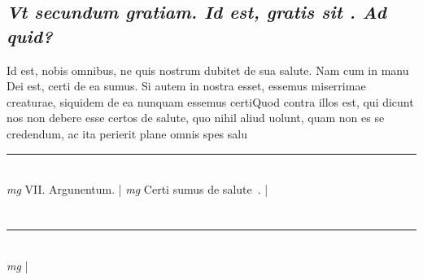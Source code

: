 \documentclass{article}
\begin{document}
\begin{pages}
\subsection*{\textit{Vt secundum gratiam. Id est, gratis sit . Ad quid? }}\pstart Id est, nobis omnibus, ne quis nostrum dubitet de sua salute. Nam cum in manu Dei est, certi de ea sumus. Si autem in nostra esset, essemus miserrimae creaturae, siquidem de ea nunquam essemus certiQuod contra illos est, qui dicunt nos non debere esse certos de salute, quo nihil aliud uolunt, quam non es se credendum, ac ita perierit plane omnis spes salu\pend
\vspace{0.5cm}\noindent
\vspace{0.2cm}\rule{1cm}{0.2pt}\\ 
\hspace{0.2cm}\textit{mg}
\footnotesize VII. Argunentum. 
\normalsize| 
\hspace{0.2cm}\textit{mg}
\footnotesize Certi sumus de salute .  
\normalsize| 
\section*{}\pstart  \pend\pstart  \pend\pstart  \pend
{}
{}
\subsection*{\textit{}}
{}
\subsection*{\textit{}}
{}
\subsection*{\textit{}}
{}
\subsection*{\textit{}}
{}
\subsection*{\textit{}}
\vspace{0.5cm}\noindent
\vspace{0.2cm}\rule{1cm}{0.2pt}\\ 
\hspace{0.2cm}\textit{mg}
\footnotesize 
\normalsize| 

\end{pages}
\end{document}
